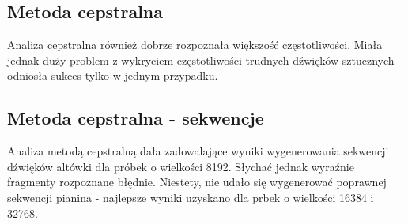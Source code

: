 \documentclass{classrep}
\begin{document}
\subsection{Metoda cepstralna}
Analiza cepstralna również dobrze rozpoznała większość częstotliwości. Miała jednak duży problem z wykryciem częstotliwości trudnych dźwięków sztucznych - odniosła sukces tylko w jednym przypadku. 

\subsection{Metoda cepstralna - sekwencje}
Analiza metodą cepstralną dała zadowalające wyniki wygenerowania sekwencji dźwięków altówki dla próbek o wielkości 8192. Słychać jednak wyraźnie fragmenty rozpoznane błędnie. Niestety, nie udało się wygenerować poprawnej sekwencji pianina - najlepsze wyniki uzyskano dla prbek o wielkości 16384 i 32768.

\begin{thebibliography}{1}
\\
\\
\\
\end{thebibliography}
\end{document}
